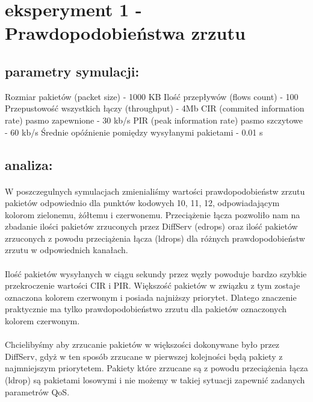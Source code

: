 \documentclass[a4paper]{article}
\begin{document}
\section{eksperyment 1 - Prawdopodobieństwa zrzutu}



\subsection{parametry symulacji:}

Rozmiar pakietów (packet size) - 1000 KB
Ilość przepływów (flows count) - 100
Przepustowość wszystkich łączy (throughput) - 4Mb 
CIR (commited information rate) pasmo zapewnione - 30 kb/s
PIR (peak information rate) pasmo szczytowe - 60 kb/s
Średnie opóźnienie pomiędzy wysyłanymi pakietami - 0.01 s

\subsection{analiza:}

\paragraph{}
W poszczegulnych symulacjach zmienialiśmy wartości prawdopodobieństw zrzutu pakietów odpowiednio dla punktów kodowych 10, 11, 12, odpowiadającym kolorom zielonemu, żółtemu i czerwonemu.
Przeciążenie łącza pozwoliło nam na zbadanie ilości pakietów zrzuconych przez DiffServ (edrops) oraz ilość pakietów zrzuconych z powodu przeciążenia łącza (ldrops) dla różnych prawdopodobieństw zrzutu w odpowiednich kanałach.

\paragraph{}
Ilość pakietów wysyłanych w ciągu sekundy przez węzły powoduje bardzo szybkie przekroczenie wartości CIR i PIR. Większość pakietów w związku z tym zostaje oznaczona kolorem czerwonym i posiada najniższy priorytet. Dlatego znaczenie praktycznie ma tylko prawdopodobieństwo zrzutu dla pakietów oznaczonych kolorem czerwonym. 

\paragraph{}
Chcielibyśmy aby zrzucanie pakietów w większości dokonywane było przez DiffServ, gdyż w ten sposób zrzucane w pierwszej kolejności będą pakiety z najmniejszym priorytetem. Pakiety które zrzucane są z powodu przeciążenia łącza (ldrop) są pakietami losowymi i nie możemy w takiej sytuacji zapewnić zadanych parametrów QoS.
\end{document}
